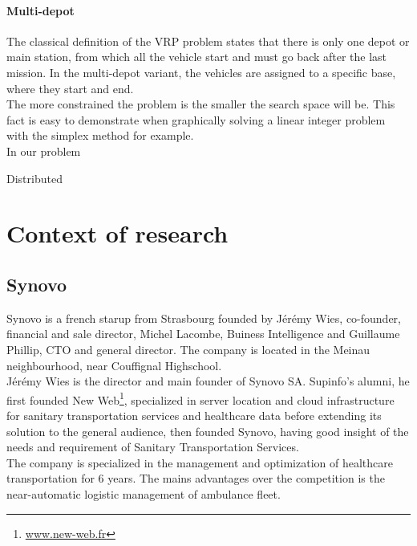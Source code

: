 \documentclass[12pt]{memoir}
\begin{document}
\paragraph{Multi-depot} %
\label{par:Multi-depot}
The classical definition of the VRP problem states that there is only one depot or
main station, from which all the vehicle start and must go back after the last
mission. In the multi-depot variant, the vehicles are assigned to a specific base,
where they start and end.\\

The more constrained the problem is the smaller the search space will be. This fact
is easy to demonstrate when graphically solving a linear integer problem with the
simplex method for example.\\
In our problem

Distributed 

\section{Context of research}
\subsection{Synovo} %

Synovo is a french starup from Strasbourg founded by Jérémy Wies, co-founder, financial and sale director, Michel Lacombe, Buiness Intelligence and Guillaume Phillip, CTO and general director. The company is located in the Meinau neighbourhood, near Couffignal Highschool.\\
Jérémy Wies is the director and main founder of Synovo SA. Supinfo's alumni, he first founded New Web\footnote{\url{www.new-web.fr}}, specialized in server location and cloud infrastructure for sanitary transportation services and healthcare data before extending its solution to the general audience, then founded Synovo, having good insight of the needs and requirement of Sanitary Transportation Services.\\
The company is specialized in the management and optimization of healthcare transportation for 6 years. The mains advantages over the competition is the near-automatic logistic management of ambulance fleet. 
\bigskip
\end{document}
